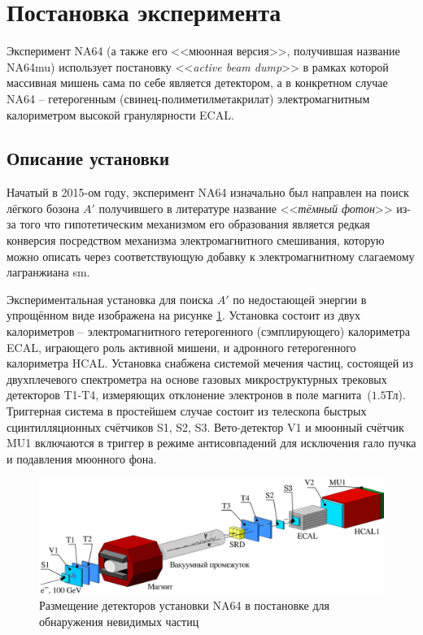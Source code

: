 \section{Постановка эксперимента}

Эксперимент NA64 (а также его <<мюонная версия>>, получившая название
NA64mu) использует постановку <<\emph{active beam dump}>> в рамках
которой массивная мишень сама по себе является детектором, а в конкретном
случае NA64 -- гетерогенным (свинец-полиметилметакрилат) электромагнитным
калориметром высокой гранулярности ECAL.

\subsection{Описание установки}

Начатый в 2015-ом году, эксперимент NA64 изначально
был направлен на поиск лёгкого бозона $A'$ получившего в литературе название
<<\emph{тёмный фотон}>> из-за того что гипотетическим механизмом его
образования является редкая конверсия посредством механизма электромагнитного
смешивания, которую можно описать через соответствующую добавку к
электромагнитному слагаемому лагранжиана \acrshort{sm}.

Экспериментальная установка для поиска $A'$ по недостающей энергии
в упрощённом виде изображена на рисунке \ref{fig:setup-schematic-invis}.
Установка состоит из двух калориметров -- электромагнитного
гетерогенного (сэмплирующего) калориметра ECAL, играющего роль активной мишени,
и адронного гетерогенного
калориметра HCAL. Установка снабжена системой мечения частиц, состоящей из
двухплечевого спектрометра на основе газовых микроструктурных трековых
детекторов T1-T4, измеряющих отклонение электронов в поле
магнита~($1.5\text{Тл}$). Триггерная система в простейшем случае
состоит из телескопа быстрых сцинтилляционных счётчиков S1, S2, S3.
Вето-детектор V1 и мюонный счётчик MU1 включаются в триггер в
режиме антисовпадений для исключения гало пучка и подавления мюонного
фона.

\begin{figure}
    \centering
    \includegraphics[width=1\linewidth]{images/illustrative/setup-schematic.eps}
    \caption{Размещение детекторов установки NA64 в постановке для обнаружения невидимых частиц}
    \label{fig:setup-schematic-invis}
\end{figure}

